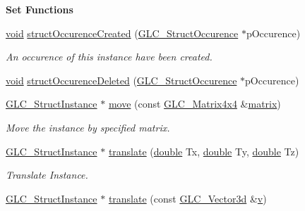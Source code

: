 \begin{Indent}{\bf Set Functions}\par
\begin{DoxyCompactItemize}
\item 
\hyperlink{group___u_a_v_objects_plugin_ga444cf2ff3f0ecbe028adce838d373f5c}{void} \hyperlink{class_g_l_c___struct_instance_a125728e0a55429cfc7d02f5369b10f3e}{struct\-Occurence\-Created} (\hyperlink{class_g_l_c___struct_occurence}{G\-L\-C\-\_\-\-Struct\-Occurence} $\ast$p\-Occurence)
\begin{DoxyCompactList}\small\item\em An occurence of this instance have been created. \end{DoxyCompactList}\item 
\hyperlink{group___u_a_v_objects_plugin_ga444cf2ff3f0ecbe028adce838d373f5c}{void} \hyperlink{class_g_l_c___struct_instance_ac5eb15cd839f19bf21c8f170203d3143}{struct\-Occurence\-Deleted} (\hyperlink{class_g_l_c___struct_occurence}{G\-L\-C\-\_\-\-Struct\-Occurence} $\ast$p\-Occurence)
\item 
\hyperlink{class_g_l_c___struct_instance}{G\-L\-C\-\_\-\-Struct\-Instance} $\ast$ \hyperlink{class_g_l_c___struct_instance_a18fed322060f88ca5372afbeff46bf62}{move} (const \hyperlink{class_g_l_c___matrix4x4}{G\-L\-C\-\_\-\-Matrix4x4} \&\hyperlink{glext_8h_a7b24a3f2f56eb1244ae69dacb4fecb6f}{matrix})
\begin{DoxyCompactList}\small\item\em Move the instance by specified matrix. \end{DoxyCompactList}\item 
\hyperlink{class_g_l_c___struct_instance}{G\-L\-C\-\_\-\-Struct\-Instance} $\ast$ \hyperlink{class_g_l_c___struct_instance_a9f983b292743e995b2c6db15629646c2}{translate} (\hyperlink{_super_l_u_support_8h_a8956b2b9f49bf918deed98379d159ca7}{double} Tx, \hyperlink{_super_l_u_support_8h_a8956b2b9f49bf918deed98379d159ca7}{double} Ty, \hyperlink{_super_l_u_support_8h_a8956b2b9f49bf918deed98379d159ca7}{double} Tz)
\begin{DoxyCompactList}\small\item\em Translate Instance. \end{DoxyCompactList}\item 
\hyperlink{class_g_l_c___struct_instance}{G\-L\-C\-\_\-\-Struct\-Instance} $\ast$ \hyperlink{class_g_l_c___struct_instance_ab85e8ccbf5ca2b9b511ecf8891bd798d}{translate} (const \hyperlink{class_g_l_c___vector3d}{G\-L\-C\-\_\-\-Vector3d} \&\hyperlink{glext_8h_a14cfbe2fc2234f5504618905b69d1e06}{v})

\end{DoxyCompactItemize}
\end{Indent}
